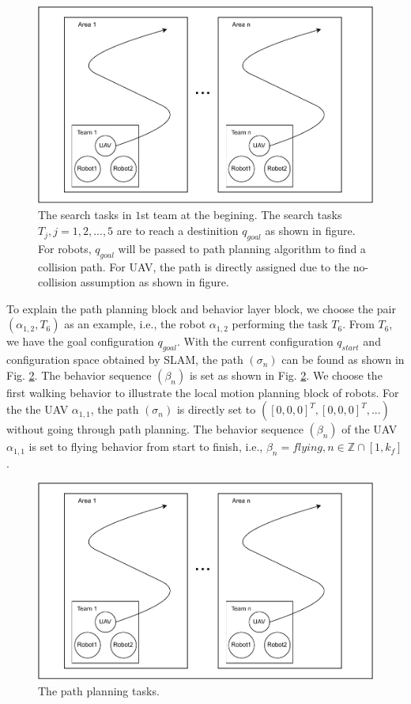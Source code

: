 \documentclass{ieeeaccess}
\begin{document}
\begin{figure}[htbp]
    \centering
    \includegraphics[scale=.42]{fig/1.pdf}\caption{The search tasks in $1$st team at the begining. The search tasks $T_j,j=1,2,...,5$ are to reach a destinition $q_{goal}$ as shown in figure. For robots, $q_{goal}$ will be passed to path planning algorithm to find a collision path. For UAV, the path is directly assigned due to the no-collision assumption as shown in figure.}%
    \label{fig:S_task}
\end{figure}

To explain the path planning block and behavior layer block, we choose the pair $(\alpha_{1,2},T_6)$ as an example, i.e., the robot $\alpha_{1,2}$ performing the task $T_6$. From $T_6$, we have the goal configuration $q_{goal}$. With the current configuration $q_{start}$ and configuration space obtained by SLAM, the path $(\sigma_n)$ can be found as shown in Fig. \ref{fig:R_task}. The behavior sequence $(\beta_n)$ is set as shown in Fig. \ref{fig:R_task}. We choose the first walking behavior to illustrate the local motion planning block of robots. For the the UAV $\alpha_{1,1}$, the path $(\sigma_n)$ is directly set to $([ 0,0,0 ]^T, [0,0,0]^T, ...)$ without going through path planning. The behavior sequence $(\beta_n)$ of the UAV $\alpha_{1,1}$ is set to flying behavior from start to finish, i.e., $\beta_n={flying}, n\in\mathbb{Z}\cap[1,k_f]$.
\begin{figure}[htbp]
    \centering
    \includegraphics[scale=.42]{fig/1.pdf}\caption{The path planning tasks.}%
    \label{fig:R_task}
\end{figure}
\end{document}
